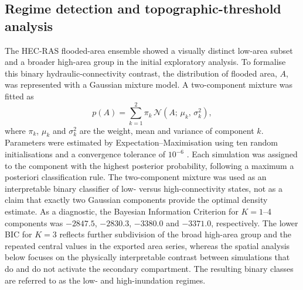 \documentclass[a4paper,fleqn]{cas-sc}
\newcommand{\hecras}{\textsc{HEC-RAS}}
\begin{document}
\subsection{Regime detection and topographic-threshold analysis}\label{sec:regime_threshold}
The \hecras{} flooded-area ensemble showed a visually distinct low-area subset and a broader high-area group in the initial exploratory analysis. To formalise this binary hydraulic-connectivity contrast, the distribution of flooded area, $A$, was represented with a Gaussian mixture model. A two-component mixture was fitted as
\begin{equation}
p(A) = \sum_{k=1}^{2} \pi_k\,
\mathcal{N}(A;\,\mu_k,\,\sigma_k^2),
\label{eq:gmm}
\end{equation}
where $\pi_k$, $\mu_k$ and $\sigma_k^2$ are the weight, mean and variance of component $k$. Parameters were estimated by Expectation--Maximisation using ten random initialisations and a convergence tolerance of $10^{-6}$ \citep{dempster1977}. Each simulation was assigned to the component with the highest posterior probability, following a maximum a posteriori classification rule. The two-component mixture was used as an interpretable binary classifier of low- versus high-connectivity states, not as a claim that exactly two Gaussian components provide the optimal density estimate. As a diagnostic, the Bayesian Information Criterion \citep{schwarz1978} for $K=1$--4 components was $-2847.5$, $-2830.3$, $-3380.0$ and $-3371.0$, respectively. The lower BIC for $K=3$ reflects further subdivision of the broad high-area group and the repeated central values in the exported area series, whereas the spatial analysis below focuses on the physically interpretable contrast between simulations that do and do not activate the secondary compartment. The resulting binary classes are referred to as the low- and high-inundation regimes.
\end{document}
